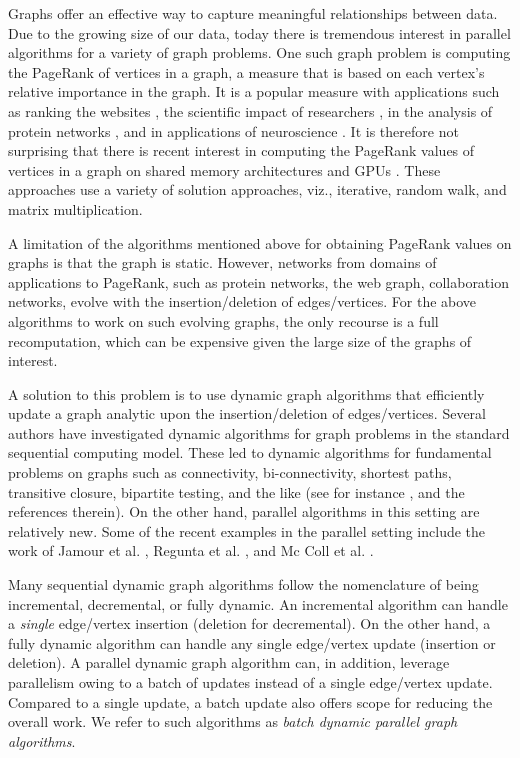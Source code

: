 Graphs offer an effective way to capture meaningful relationships between data. Due to the growing size of our data, today there is tremendous interest in parallel algorithms for a variety of graph problems. One such graph problem is computing the PageRank of vertices in a graph, a measure that is based on each vertex's relative importance in the graph. It is a popular measure with applications such as ranking the websites \cite{page}, the scientific impact of researchers \cite{zomaya}, in the analysis of protein networks \cite{protein}, and in applications of neuroscience \cite{neuro}. It is therefore not surprising that there is recent interest in computing the PageRank values of vertices in a graph on shared memory architectures \cite{pr-sticd16,hipc17} and GPUs \cite{hipc19}. These approaches use a variety of solution approaches, viz., iterative, random walk, and matrix multiplication.

A limitation of the algorithms mentioned above for obtaining PageRank values on graphs is that the graph is static. However, networks from domains of applications to PageRank, such as protein networks, the web graph, collaboration networks, evolve with the insertion/deletion of edges/vertices. For the above algorithms to work on such evolving graphs, the only recourse is a full recomputation, which can be expensive given the large size of the graphs of interest.

A solution to this problem is to use dynamic graph algorithms that efficiently update a graph analytic upon the insertion/deletion of edges/vertices. Several authors have investigated dynamic algorithms for graph problems in the standard sequential computing model. These led to dynamic algorithms for fundamental problems on graphs such as connectivity, bi-connectivity, shortest paths, transitive closure, bipartite testing, and the like (see for instance \cite{eppstein}, and the references therein). On the other hand, parallel algorithms in this setting are relatively new. Some of the recent examples in the parallel setting include the work of Jamour et al. \cite{jamour}, Regunta et al. \cite{cent-shukla20}, and Mc Coll et al. \cite{cc-mccoll13}.

Many sequential dynamic graph algorithms follow the nomenclature of being incremental, decremental, or fully dynamic. An incremental algorithm can handle a {\em single} edge/vertex insertion (deletion for decremental). On the other hand, a fully dynamic algorithm can handle any single edge/vertex update (insertion or deletion). A parallel dynamic graph algorithm can, in addition, leverage parallelism owing to a batch of updates instead of a single edge/vertex update. Compared to a single update, a batch update also offers scope for reducing the overall work. We refer to such algorithms as {\em batch dynamic parallel graph algorithms}. 

